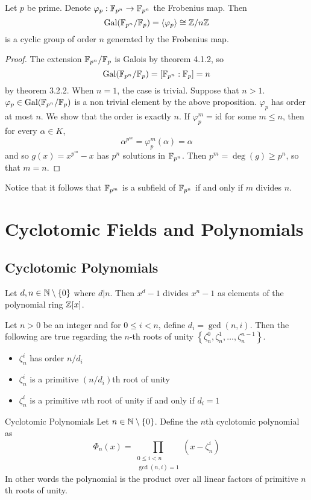\documentclass[a4paper]{article}
\begin{document}
\begin{thm}{}{} Let $p$ be prime. Denote $\varphi_p:\mathbb{F}_{p^n}\to\mathbb{F}_{p^n}$ the Frobenius map. Then $$\text{Gal}(\mathbb{F}_{p^n}/\mathbb{F}_p)=\langle\varphi_p\rangle\cong\mathbb{Z}/n\mathbb{Z}$$ is a cyclic group of order $n$ generated by the Frobenius map. \tcbline
\begin{proof}
The extension $\mathbb{F}_{p^n}/\mathbb{F}_p$ is Galois by theorem 4.1.2, so $$\text{Gal}(\mathbb{F}_{p^n}/\mathbb{F}_p)=[\mathbb{F}_{p^n}:\mathbb{F}_p]=n$$ by theorem 3.2.2. When $n=1$, the case is trivial. Suppose that $n>1$. $\varphi_p\in\text{Gal}(\mathbb{F}_{p^n}/\mathbb{F}_p)$ is a non trivial element by the above proposition. $\varphi_p$ has order at most $n$. We show that the order is exactly $n$. If $\varphi_p^m=\text{id}$ for some $m\leq n$, then for every $\alpha\in K$, $$\alpha^{p^m}=\varphi_p^m(\alpha)=\alpha$$ and so $g(x)=x^{p^m}-x$ has $p^n$ solutions in $\mathbb{F}_{p^n}$. Then $p^m=\deg(g)\geq p^n$, so that $m=n$. 
\end{proof}
\end{thm}

Notice that it follows that $\mathbb{F}_{p^m}$ is a subfield of $\mathbb{F}_{p^n}$ if and only if $m$ divides $n$. 

\pagebreak
\section{Cyclotomic Fields and Polynomials}
\subsection{Cyclotomic Polynomials}
\begin{lmm}{}{} Let $d,n\in\mathbb{N}\setminus\{0\}$ where $d|n$. Then $x^d-1$ divides $x^n-1$ as elements of the polynomial ring $\mathbb{Z}[x]$. 
\end{lmm}

\begin{lmm}{}{} Let $n>0$ be an integer and for $0\leq i<n$, define $d_i=\gcd(n,i)$. Then the following are true regarding the $n$-th roots of unity $\left\{\zeta_n^0,\zeta_n^1,\dots,\zeta_n^{n-1}\right\}$. 
\begin{itemize}
\item $\zeta_n^i$ has order $n/d_i$
\item $\zeta_n^i$ is a primitive $(n/d_i)$th root of unity
\item $\zeta_n^i$ is a primitive $n$th root of unity if and only if $d_i=1$
\end{itemize}
\end{lmm}

\begin{defn}{Cyclotomic Polynomials}{} Let $n\in\mathbb{N}\setminus\{0\}$. Define the $n$th cyclotomic polynomial as $$\Phi_n(x)=\prod_{\substack{0\leq i<n\\\gcd(n,i)=1}}\left(x-\zeta_n^i\right)$$
In other words the polynomial is the product over all linear factors of primitive $n$th roots of unity. 
\end{defn}
\end{document}
